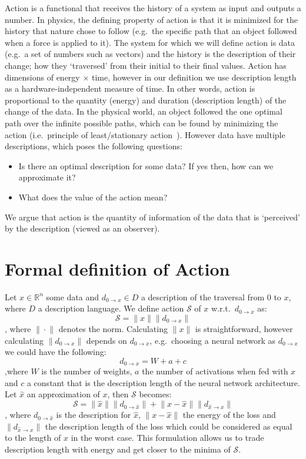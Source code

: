 \documentclass[twoside,11pt]{article}
\begin{document}
Action is a functional that receives the history of a system as input and outputs a number.
In physics, the defining property of action is that it is minimized for the history that nature chose to follow (e.g.\ the specific path that an object followed when a force is applied to it).
The system for which we will define action is data (e.g.\ a set of numbers such as vectors) and the history is the description of their change; how they `traversed' from their initial to their final values.
Action has dimensions of energy \(\times\) time, however in our definition we use description length as a hardware-independent measure of time.
In other words, action is proportional to the quantity (energy) and duration (description length) of the change of the data. 
In the physical world, an object followed the one optimal path over the infinite possible paths, which can be found by minimizing the action (i.e.\ principle of least/stationary action~\cite{siburg2004principle}).
However data have multiple descriptions, which poses the following questions: 
\begin{itemize}
	\item Is there an optimal description for some data? If yes then, how can we approximate it?
	\item What does the value of the action mean?
\end{itemize}
We argue that action is the quantity of information of the data that is `perceived' by the description (viewed as an observer).

\section{Formal definition of Action}
Let \(x \in \mathbb{R}^n\) some data and \(d_{0 \rightarrow x} \in D\) a description of the traversal from \(0\) to \(x\), where \(D\) a description language.
We define action \(\mathcal{S}\) of \(x\) w.r.t.\ \(d_{0 \rightarrow x}\) as:
\[\mathcal{S} = \big\| x \big\| \big\| d_{0 \rightarrow x} \big\|\]
, where \(\big\| \cdot \big\|\) denotes the norm.
Calculating \(\big\| x \big\|\) is straightforward, however calculating \(\big\| d_{0 \rightarrow x} \big\|\) depends on \(d_{0 \rightarrow x}\), e.g.\ choosing a neural network as \(d_{0 \rightarrow x}\) we could have the following:
\[d_{0 \rightarrow x} = W + a + c\]
,where \(W\) is the number of weights, \(a\) the number of activations when fed with \(x\) and \(c\) a constant that is the description length of the neural network architecture. 
Let \(\hat{x}\) an approximation of \(x\), then \(\mathcal{S}\) becomes:
\[\mathcal{S} = \big\| \hat{x} \big\| \big\| d_{0 \rightarrow \hat{x}} \big\| + \big\| x - \hat{x} \big\| \big\| d_{\hat{x} \rightarrow x} \big\|\]
, where \(d_{0 \rightarrow \hat{x}}\) is the description for \(\hat{x}\), \(\big\| x - \hat{x} \big\|\) the energy of the loss and \(\big\| d_{\hat{x} \rightarrow x} \big\|\) the description length of the loss which could be considered as equal to the length of \(x\) in the worst case.
This formulation allows us to trade description length with energy and get closer to the minima of \(\mathcal{S}\).
\end{document}
